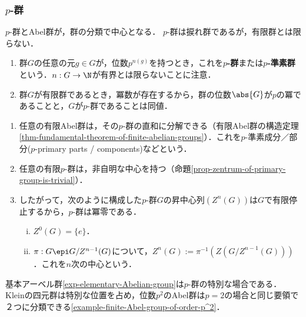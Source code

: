 \documentclass[uplatex,dvipdfmx]{jsreport}
\begin{document}
\subsubsection{$p$-群}

\begin{tcolorbox}[colframe=ForestGreen, colback=ForestGreen!10!white,breakable,colbacktitle=ForestGreen!40!white,coltitle=black,fonttitle=\bfseries\sffamily,
title=]
    $p$-群とAbel群が，群の分類で中心となる．
    $p$-群は捩れ群であるが，有限群とは限らない．
\end{tcolorbox}

\begin{definition}\mbox{}
    \begin{enumerate}
        \item 群$G$の任意の元$g\in G$が，位数$p^{n(g)}$を持つとき，これを\textbf{$p$-群}または\textbf{$p$-準素群}という．$n:G\to\N$が有界とは限らないことに注意．
        \item 群$G$が有限群であるとき，冪数が存在するから，群の位数$\abs{G}$が$p$の冪であることと，$G$が$p$-群であることは同値．
    \end{enumerate}
\end{definition}
\begin{remarks}\mbox{}
    \begin{enumerate}
        \item 任意の有限Abel群は，その$p$-群の直和に分解できる（有限Abel群の構造定理\ref{thm-fundamental-theorem-of-finite-abelian-groups}）．これを$p$-準素成分／部分($p$-primary parts / components)などという．
        \item 任意の有限$p$-群は，非自明な中心を持つ（命題\ref{prop-zentrum-of-primary-group-is-trivial}）．
        \item したがって，次のように構成した$p$-群$G$の昇中心列$(Z^n(G))$は$G$で有限停止するから，$p$-群は冪零である．
        \begin{enumerate}[(i)]
            \item $Z^0(G)=\{e\}$．
            \item $\pi:G\epi G/Z^{n-1}(G)$について，$Z^n(G):=\pi^{-1}(Z(G/Z^{n-1}(G)))$．これを$n$次の中心という．
        \end{enumerate}
    \end{enumerate}
\end{remarks}
\begin{remark}[基本アーベル群]
    基本アーベル群\ref{exp-elementary-Abelian-group}は$p$-群の特別な場合である．
    Kleinの四元群は特別な位置を占め，位数$p^2$のAbel群は$p=2$の場合と同じ要領で２つに分類できる\ref{example-finite-Abel-group-of-order-p^2}．
\end{remark}
\end{document}
